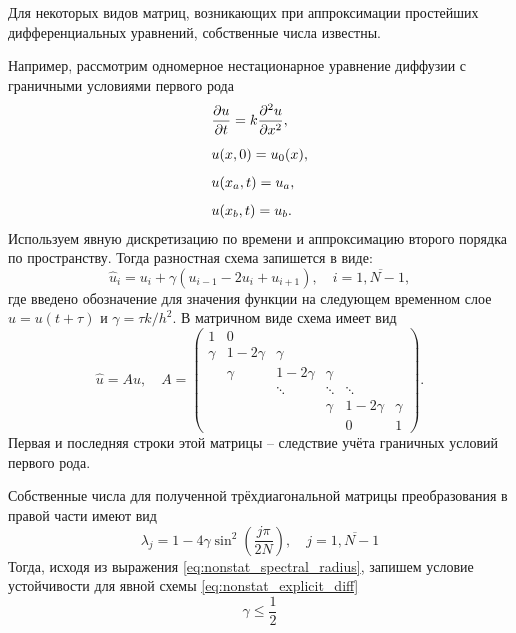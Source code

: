 Для некоторых видов матриц, возникающих при аппроксимации простейших дифференциальных уравнений,
собственные числа известны.

\label{sec:NonstatExpDiff}

Например, рассмотрим одномерное нестационарное уравнение диффузии с граничными условиями первого рода
\begin{align*}
    &\frac{\partial u}{\partial t} = k\frac{\partial^2 u}{\partial x^2},\\[5pt]
    &u(x, 0) = u_0(x),\\[5pt]
    &u(x_a, t) = u_a,\\[5pt]
    &u(x_b, t) = u_b.\\
\end{align*}
Используем явную дискретизацию по времени и аппроксимацию второго порядка по пространству.
Тогда разностная схема запишется в виде:
\begin{equation}
    \label{eq:nonstat_explicit_diff}
    \hat u_i = u_i + \gamma (u_{i-1} - 2 u_i + u_{i+1}), \quad i = \overline{1, N-1},
\end{equation}
где введено обозначение для значения функции на следующем временном слое $\hat u = u(t+\tau)$ и $\gamma = \tau k / h^2 $.
В матричном виде схема имеет вид
\begin{equation*}
    \hat u = A u, \quad
    A = \left(
        \begin{array}{cccccc}
            1      & 0          &           &            &           &        \\
            \gamma & 1-2\gamma  & \gamma    &            &           &        \\
                   & \gamma     & 1-2\gamma & \gamma     &           &        \\
                   &            & \ddots    & \ddots     & \ddots    &        \\
                   &            &           & \gamma     & 1-2\gamma & \gamma \\ 
                   &            &           &            & 0         & 1      
        \end{array}
    \right).
\end{equation*}
Первая и последняя строки этой матрицы -- следствие учёта граничных условий первого рода.

Собственные числа для полученной трёхдиагональной матрицы преобразования в правой части имеют вид
\begin{equation*}
    \lambda_j = 1 - 4\gamma\sin^2\left(\frac{j\pi}{2 N}\right), \quad j = \overline{1, N-1}
\end{equation*}
Тогда, исходя из выражения \eqref{eq:nonstat_spectral_radius}, запишем условие устойчивости
для явной схемы \eqref{eq:nonstat_explicit_diff}
\begin{equation*}
    \gamma \leq \frac12
\end{equation*}

